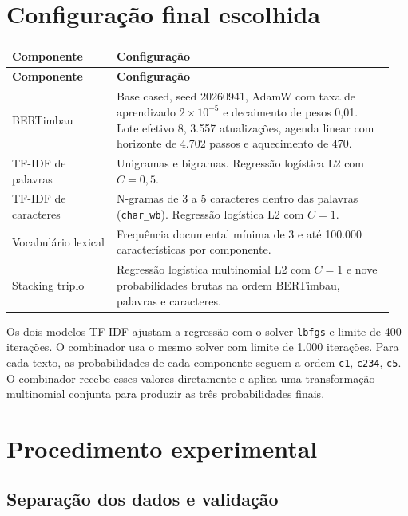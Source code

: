 \documentclass[11pt,a4paper]{article}
\begin{document}
\section{Configuração final escolhida}

\begingroup\small
\begin{longtable}{@{}>{\raggedright\arraybackslash}p{0.26\linewidth}>{\raggedright\arraybackslash}p{0.69\linewidth}@{}}
\toprule
\textbf{Componente} & \textbf{Configuração}\\
\midrule
\endfirsthead
\toprule
\textbf{Componente} & \textbf{Configuração}\\
\midrule
\endhead
\bottomrule
\endfoot
BERTimbau & Base cased, seed 20260941, AdamW com taxa de aprendizado $2\times10^{-5}$ e decaimento de pesos 0,01. Lote efetivo 8, 3.557 atualizações, agenda linear com horizonte de 4.702 passos e aquecimento de 470.\\
TF-IDF de palavras & Unigramas e bigramas. Regressão logística L2 com $C=0{,}5$.\\
TF-IDF de caracteres & N-gramas de 3 a 5 caracteres dentro das palavras (\nolinkurl{char_wb}). Regressão logística L2 com $C=1$.\\
Vocabulário lexical & Frequência documental mínima de 3 e até 100.000 características por componente.\\
Stacking triplo & Regressão logística multinomial L2 com $C=1$ e nove probabilidades brutas na ordem BERTimbau, palavras e caracteres.\\
\end{longtable}
\endgroup

Os dois modelos TF-IDF ajustam a regressão com o solver \nolinkurl{lbfgs} e limite de 400 iterações. O combinador usa o mesmo solver com limite de 1.000 iterações. Para cada texto, as probabilidades de cada componente seguem a ordem \nolinkurl{c1}, \nolinkurl{c234}, \nolinkurl{c5}. O combinador recebe esses valores diretamente e aplica uma transformação multinomial conjunta para produzir as três probabilidades finais.

\clearpage
\section{Procedimento experimental}

\subsection{Separação dos dados e validação}
\end{document}
